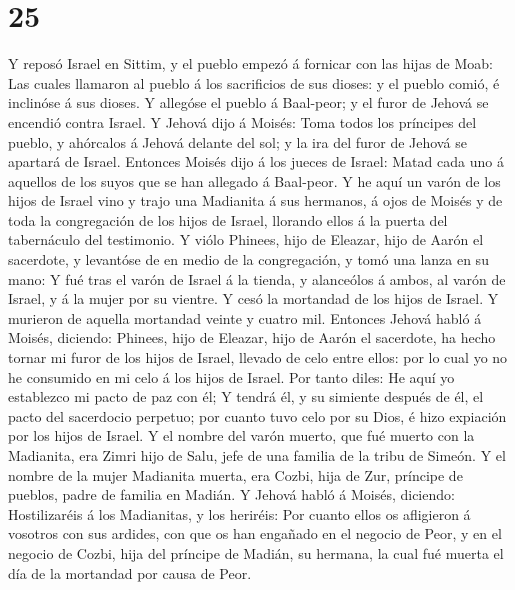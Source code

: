 \hypertarget{section-24}{%
\section{25}\label{section-24}}

 Y reposó Israel en Sittim, y el pueblo empezó á fornicar
con las hijas de Moab:  Las cuales llamaron al pueblo á
los sacrificios de sus dioses: y el pueblo comió, é inclinóse á sus
dioses.  Y allegóse el pueblo á Baal-peor; y el furor de
Jehová se encendió contra Israel.  Y Jehová dijo á Moisés:
Toma todos los príncipes del pueblo, y ahórcalos á Jehová delante del
sol; y la ira del furor de Jehová se apartará de Israel. 
Entonces Moisés dijo á los jueces de Israel: Matad cada uno á aquellos
de los suyos que se han allegado á Baal-peor.  Y he aquí
un varón de los hijos de Israel vino y trajo una Madianita á sus
hermanos, á ojos de Moisés y de toda la congregación de los hijos de
Israel, llorando ellos á la puerta del tabernáculo del testimonio.
 Y viólo Phinees, hijo de Eleazar, hijo de Aarón el
sacerdote, y levantóse de en medio de la congregación, y tomó una lanza
en su mano:  Y fué tras el varón de Israel á la tienda, y
alanceólos á ambos, al varón de Israel, y á la mujer por su vientre. Y
cesó la mortandad de los hijos de Israel.  Y murieron de
aquella mortandad veinte y cuatro mil.  Entonces Jehová
habló á Moisés, diciendo:  Phinees, hijo de Eleazar, hijo
de Aarón el sacerdote, ha hecho tornar mi furor de los hijos de Israel,
llevado de celo entre ellos: por lo cual yo no he consumido en mi celo á
los hijos de Israel.  Por tanto diles: He aquí yo
establezco mi pacto de paz con él;  Y tendrá él, y su
simiente después de él, el pacto del sacerdocio perpetuo; por cuanto
tuvo celo por su Dios, é hizo expiación por los hijos de Israel.
 Y el nombre del varón muerto, que fué muerto con la
Madianita, era Zimri hijo de Salu, jefe de una familia de la tribu de
Simeón.  Y el nombre de la mujer Madianita muerta, era
Cozbi, hija de Zur, príncipe de pueblos, padre de familia en Madián.
 Y Jehová habló á Moisés, diciendo: 
Hostilizaréis á los Madianitas, y los heriréis:  Por
cuanto ellos os afligieron á vosotros con sus ardides, con que os han
engañado en el negocio de Peor, y en el negocio de Cozbi, hija del
príncipe de Madián, su hermana, la cual fué muerta el día de la
mortandad por causa de Peor.

